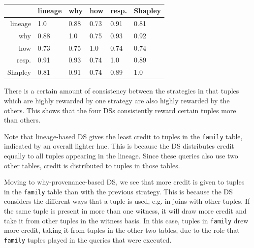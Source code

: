 \begin{table}[]
\center
  \caption{}
  \begin{tabular}{|r|l|l|l|l|l|}
  \hline
 & lineage & why & how & resp. & Shapley \\
  \hline
 lineage & 1.0 & 0.88 & 0.73 & 0.91  & 0.81 \\
why & 0.88 & 1.0 & 0.75 & 0.93 & 0.92 \\
 how & 0.73 & 0.75 & 1.0 & 0.74 & 0.74  \\
 resp. & 0.91 & 0.93 & 0.74 & 1.0 & 0.89 \\
Shapley & 0.81 & 0.91 & 0.74 & 0.89 & 1.0 \\
 \hline
  \end{tabular}
  \label{table:kendall_tau}
\end{table}
\normalsize


There is a certain amount of consistency between the strategies in that tuples which are highly rewarded by one strategy are also highly rewarded by the others. This shows that the four DSs consistently reward certain tuples more than others. 


Note that lineage-based DS gives the least credit to tuples in the \texttt{family} table, indicated by an overall lighter hue. This is because the DS  distributes credit equally to all tuples appearing in the lineage. Since these queries also use two other tables, credit is distributed to tuples in those tables.

Moving to why-provenance-based DS, we see that more credit is given to tuples in the \texttt{family} table than with the previous strategy. This is because the DS considers the different ways that a tuple is used, e.g. in joins with other tuples. If the same tuple is present in more than one witness, it will draw more credit and take it from  other tuples in the witness basis. In this case, tuples in \texttt{family} drew more credit, taking it from tuples in the other two tables, due to the role that \texttt{family}  tuples played in the queries that were executed. 

